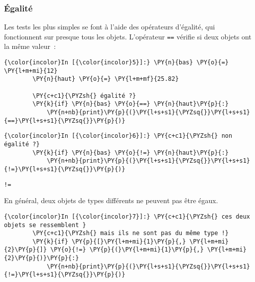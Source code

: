     \hypertarget{uxe9galituxe9}{%
\subsubsection{Égalité}\label{uxe9galituxe9}}

    Les tests les plus simples se font à l'aide des opérateurs d'égalité,
qui fonctionnent sur presque tous les objets. L'opérateur \texttt{==}
vérifie si deux objets ont la même valeur~:

    \begin{Verbatim}[commandchars=\\\{\},frame=single,framerule=0.3mm,rulecolor=\color{cellframecolor}]
{\color{incolor}In [{\color{incolor}5}]:} \PY{n}{bas} \PY{o}{=} \PY{l+m+mi}{12}
        \PY{n}{haut} \PY{o}{=} \PY{l+m+mf}{25.82}
        
        \PY{c+c1}{\PYZsh{} égalité ?}
        \PY{k}{if} \PY{n}{bas} \PY{o}{==} \PY{n}{haut}\PY{p}{:}
            \PY{n+nb}{print}\PY{p}{(}\PY{l+s+s1}{\PYZsq{}}\PY{l+s+s1}{==}\PY{l+s+s1}{\PYZsq{}}\PY{p}{)}
\end{Verbatim}


    \begin{Verbatim}[commandchars=\\\{\},frame=single,framerule=0.3mm,rulecolor=\color{cellframecolor}]
{\color{incolor}In [{\color{incolor}6}]:} \PY{c+c1}{\PYZsh{} non égalité ?}
        \PY{k}{if} \PY{n}{bas} \PY{o}{!=} \PY{n}{haut}\PY{p}{:}
            \PY{n+nb}{print}\PY{p}{(}\PY{l+s+s1}{\PYZsq{}}\PY{l+s+s1}{!=}\PY{l+s+s1}{\PYZsq{}}\PY{p}{)}
\end{Verbatim}


    \begin{Verbatim}[commandchars=\\\{\},frame=single,framerule=0.3mm,rulecolor=\color{cellframecolor}]
!=
\end{Verbatim}

    En général, deux objets de types différents ne peuvent pas être égaux.

    \begin{Verbatim}[commandchars=\\\{\},frame=single,framerule=0.3mm,rulecolor=\color{cellframecolor}]
{\color{incolor}In [{\color{incolor}7}]:} \PY{c+c1}{\PYZsh{} ces deux objets se ressemblent }
        \PY{c+c1}{\PYZsh{} mais ils ne sont pas du même type !}
        \PY{k}{if} \PY{p}{[}\PY{l+m+mi}{1}\PY{p}{,} \PY{l+m+mi}{2}\PY{p}{]} \PY{o}{!=} \PY{p}{(}\PY{l+m+mi}{1}\PY{p}{,} \PY{l+m+mi}{2}\PY{p}{)}\PY{p}{:}
            \PY{n+nb}{print}\PY{p}{(}\PY{l+s+s1}{\PYZsq{}}\PY{l+s+s1}{!=}\PY{l+s+s1}{\PYZsq{}}\PY{p}{)}
\end{Verbatim}


